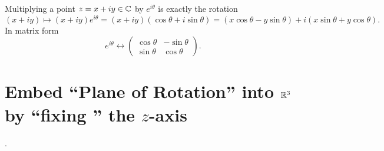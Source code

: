 \documentclass[11pt,openany]{article}
\begin{document}
\newpage
\noindent Multiplying a point $z=x+iy\in\mathbb{C}$ by $e^{i\theta}$ is exactly the rotation\[
(x+iy)\mapsto (x+iy)e^{i\theta}=(x+iy)(\cos\theta+i\sin\theta)=(x\cos\theta-y\sin\theta)+i(x\sin\theta+y\cos\theta).
\] In matrix form \[
e^{i\theta}\longleftrightarrow\begin{pmatrix}
	\cos\theta & -\sin\theta \\
	\sin\theta & \cos\theta
\end{pmatrix}.
\]

\section{Embed ``Plane of Rotation'' into $\mathbb{R}^3$ by ``fixing '' the $z$-axis}.
\end{document}
